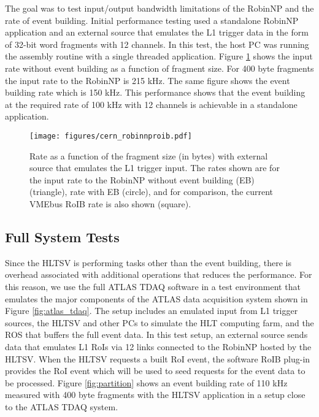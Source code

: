 The goal was to test input/output bandwidth limitations of the RobinNP and the rate of event building. Initial performance testing used 
a standalone RobinNP application and an external source that emulates the L1 trigger data 
in the form of 32-bit word fragments with 12 channels. In this test, the host PC was running the assembly routine with a single threaded application.  Figure \ref{fig:cern_robinnproib} shows the input rate without 
event building as a function of fragment size. For 400 byte fragments the input rate to the RobinNP is 215 kHz. 
The same figure 
shows the event building rate which is 150 kHz. This performance shows that the event building 
at the required rate of 100 kHz with 12 channels is achievable in a standalone application.  


\begin{figure}[tbp] %
\centering
\texttt{[image: figures/cern\_robinnproib.pdf]}
\caption{Rate as a function of the fragment size (in bytes) with external source that emulates the L1 trigger input. 
The rates shown are for the input rate to the RobinNP without event building (EB) (triangle), rate with EB (circle), and 
for comparison, the current VMEbus RoIB rate is also shown (square).  }
\label{fig:cern_robinnproib}
\end{figure}


\subsection{Full System Tests}\label{sec:perf_tdaq}

Since the HLTSV is performing tasks other than the event building, there is overhead associated with additional operations 
that reduces the performance. For this reason, we use the full ATLAS TDAQ software in a test environment that emulates the major components of the ATLAS data acquisition system shown in Figure \ref{fig:atlas_tdaq}. The setup includes an emulated input from L1 trigger sources, 
the HLTSV and other PCs to simulate the HLT computing farm, and the ROS that buffers the full event data. 
 In this test setup, an external source sends data that emulates L1 RoIs via 12 links connected to the 
RobinNP hosted by the HLTSV. When the HLTSV requests a built RoI event, the software RoIB plug-in provides the RoI event which will be used 
to seed requests for the event data to be processed.
 Figure \ref{fig:partition} shows an event building rate of 110 kHz measured with 400 byte fragments with the HLTSV application in a setup close to the ATLAS TDAQ system. 

